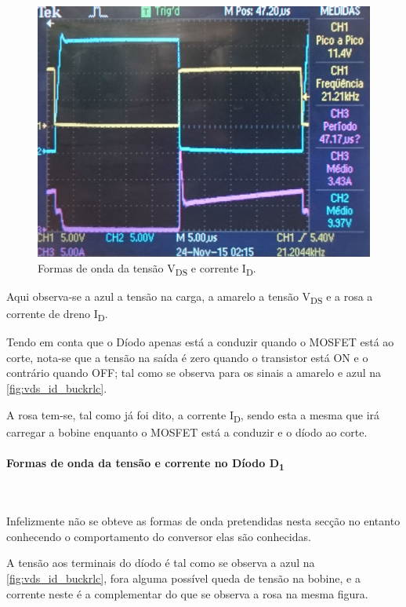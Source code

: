 \documentclass[a4paper,11pt]{article}
\numberwithin{equation}{section}
\begin{document}
\begin{figure}[H]
	\centering
	\includegraphics[keepaspectratio=true, scale=0.17]{img/figs/vds_id_buckrlc}
	\caption{Formas de onda da tensão V\textsubscript{DS} e corrente I\textsubscript{D}.}
	\label{fig:vds_id_buckrlc}
	\vspace{-0.8em}
\end{figure} 

Aqui observa-se a azul a tensão na carga, a amarelo a tensão V\textsubscript{DS} e a rosa a corrente de dreno I\textsubscript{D}.

Tendo em conta que o Díodo apenas está a conduzir quando o MOSFET está ao corte, nota-se que a tensão na saída é zero quando o transistor está ON e o contrário quando OFF; tal como se observa para os sinais a amarelo e azul na \autoref{fig:vds_id_buckrlc}.

A rosa tem-se, tal como já foi dito, a corrente I\textsubscript{D}, sendo esta a mesma que irá carregar a bobine enquanto o MOSFET está a conduzir e o díodo ao corte.

\paragraph{Formas de onda da tensão e corrente no Díodo D\textsubscript{1}}\mbox{}\

Infelizmente não se obteve as formas de onda pretendidas nesta secção no entanto conhecendo o comportamento do conversor elas são conhecidas.

A tensão aos terminais do díodo é tal como se observa a azul na \autoref{fig:vds_id_buckrlc}, fora alguma possível queda de tensão na bobine, e a corrente neste é a complementar do que se observa a rosa na mesma figura.
\end{document}
